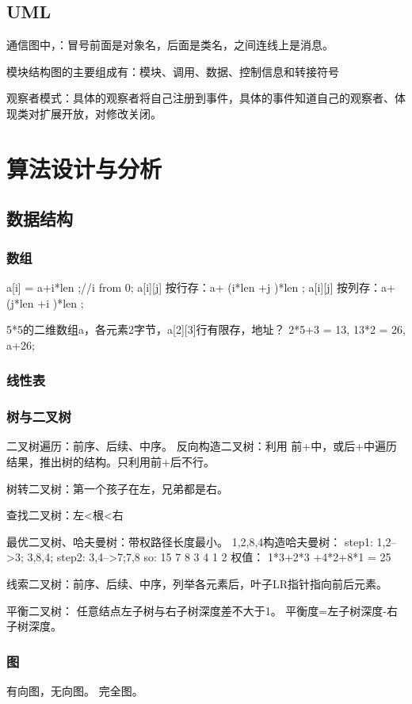 \documentclass[UTF8]{article}
\begin{document}
\subsection{UML}
通信图中，：冒号前面是对象名，后面是类名，之间连线上是消息。

模块结构图的主要组成有：模块、调用、数据、控制信息和转接符号


观察者模式：具体的观察者将自己注册到事件，具体的事件知道自己的观察者、体现类对扩展开放，对修改关闭。

\section{算法设计与分析}


\subsection{数据结构}

\subsubsection{数组}
 a[i] = a+i*len ;//i from 0;
 a[i][j]  按行存：a+ (i*len +j )*len ;
 a[i][j]  按列存：a+ (j*len +i )*len ;

 5*5的二维数组a，各元素2字节，a[2][3]行有限存，地址？
 2*5+3 = 13, 13*2 = 26, a+26;
\subsubsection{线性表}

\subsubsection{树与二叉树}

二叉树遍历：前序、后续、中序。
反向构造二叉树：利用 前+中，或后+中遍历结果，推出树的结构。只利用前+后不行。

树转二叉树：第一个孩子在左，兄弟都是右。

查找二叉树：左<根<右


最优二叉树、哈夫曼树：带权路径长度最小。 
1,2,8,4构造哈夫曼树：
step1: 1,2-->3; 3,8,4;
step2: 3,4-->7;7,8
so:        15
      7       8
   3    4
1    2
权值： 1*3+2*3 +4*2+8*1 = 25

线索二叉树：前序、后续、中序，列举各元素后，叶子LR指针指向前后元素。

平衡二叉树：
任意结点左子树与右子树深度差不大于1。
平衡度=左子树深度-右子树深度。


\subsubsection{图}
有向图，无向图。
完全图。
\end{document}

